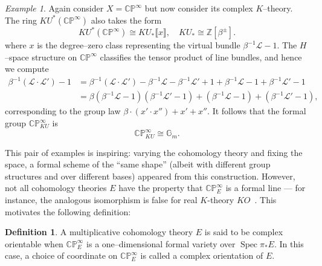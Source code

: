 \documentclass{amsart}
\newcommand{\Z}{\mathbb Z}
\newcommand{\G}{\mathbb G}
\newcommand{\C}{\mathbb{C}}
\newcommand{\CP}{\C\P}
\renewcommand{\P}{\mathbb{P}}
\newcommand{\<}{\langle}
\renewcommand{\>}{\rangle}
\newcommand{\sheaf}[1]{\mathcal{#1}}
\DeclareMathOperator{\Spec}{Spec}
\theoremstyle{plain}
\theoremstyle{definition}
\newtheorem*{definition}{Definition}
\theoremstyle{remark}
\newtheorem*{example}{Example}
\begin{document}
\begin{example}
Again consider $X = \CP^\infty$ but now consider its complex $K$--theory.  The ring $KU^*(\CP^\infty)$ also takes the form \[KU^*(\CP^\infty) \cong KU_*\llbracket x \rrbracket, \quad KU_* \cong \Z[\beta^\pm].\] where $x$ is the degree--zero class representing the virtual bundle $\beta^{-1} \sheaf L - 1$.  The $H$--space structure on $\CP^\infty$ classifies the tensor product of line bundles, and hence we compute
\begin{align*}
\beta^{-1} (\sheaf L \cdot \sheaf L') - 1 & = \beta^{-1} (\sheaf L \cdot \sheaf L') - \beta^{-1} \sheaf L - \beta^{-1} \sheaf L' + 1 + \beta^{-1} \sheaf L - 1 + \beta^{-1} \sheaf L' - 1 \\
& = \beta (\beta^{-1} \sheaf L - 1)(\beta^{-1} \sheaf L' - 1) + (\beta^{-1} \sheaf L - 1) + (\beta^{-1} \sheaf L' - 1),
\end{align*}
corresponding to the group law $\beta \cdot (x' \cdot x'') + x' + x''$.  It follows that the formal group $\CP^\infty_{KU}$ is \[\CP^\infty_{KU} \cong \G_m.\]
\end{example}

This pair of examples is inspiring: varying the cohomology theory and fixing the space, a formal scheme of the ``same shape'' (albeit with different group structures and over different bases) appeared from this construction.  However, not all cohomology theories $E$ have the property that $\CP^\infty_E$ is a formal line --- for instance, the analogous isomorphism is false for real $K$-theory $KO$~\cite[Corollary 2.13]{Yamaguchi}.  This motivates the following definition:

\begin{definition}
A multiplicative cohomology theory $E$ is said to be complex orientable when $\CP^\infty_E$ is a one--dimensional formal variety over $\Spec \pi_* E$.  In this case, a choice of coordinate on $\CP^\infty_E$ is called a complex orientation of $E$.
\end{definition}
\end{document}
